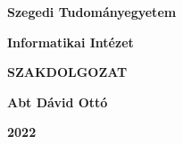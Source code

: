 \documentclass[12pt,numbers=noenddot]{report}
\begin{document}
\pagestyle{fancyplain}
\fancyhf{}
\renewcommand{\headrulewidth}{0pt}	%

\titlespacing*{\chapter}{0pt}{0pt}{40pt}

\newcommand{\szerzo}{Abt Dávid Ottó}
\newcommand{\cim}{Másodrendű sajátvektor centralitások vizsgálata}


\newpage
\thispagestyle{empty}
\fancyfoot[C]{}	%

\begin{center}

	\vspace*{2cm}

	{\Large\bf Szegedi Tudományegyetem}

	\vspace{.5cm}

	{\Large\bf Informatikai Intézet}

	\vspace*{8.5cm}

	{\Huge\bf SZAKDOLGOZAT}

	\vspace*{7cm}

	{\LARGE\bf \szerzo}

	\vspace*{.6cm}

	{\Large\bf 2022}

\end{center}


\newpage
\thispagestyle{plain}
\end{document}
